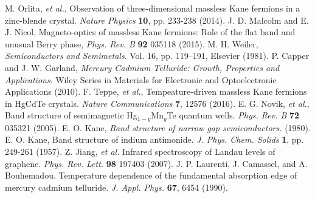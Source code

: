 \documentclass[titlepage,a4paper]{book}
\begin{document}
\begin{thebibliography}{99}
M. Orlita, \textit{et al.}, Observation of three-dimensional massless Kane fermions in a zinc-blende crystal. \textit{Nature Physics} \textbf{10}, pp. 233-238 (2014).
J. D. Malcolm and E. J. Nicol, Magneto-optics of massless Kane fermions: Role of the flat band and unusual Berry phase, \textit{Phys. Rev. B} \textbf{92} 035118 (2015).
M. H. Weiler, \textit{Semiconductors and Semimetals}. Vol. 16, pp. 119–191, Elsevier (1981).
P. Capper and J. W. Garland, \textit{Mercury Cadmium Telluride: Growth, Properties and Applications}. Wiley Series in Materials for Electronic and Optoelectronic Applications (2010).
F. Teppe, \textit{et al.}, Tempeature-driven massless Kane fermions in HgCdTe crystals. \textit{Nature Communications} \textbf{7}, 12576 (2016).
E. G. Novik, \textit{et al.}, Band structure of semimagnetic Hg$_{1-y}$Mn$_y$Te quantum wells. \textit{Phys. Rev. B} \textbf{72} 035321 (2005).
E. O. Kane, \textit{Band structure of narrow gap semiconductors.} (1980).
E. O. Kane, Band structure of indium antimonide. \textit{J. Phys. Chem. Solids} \textbf{1}, pp. 249-261 (1957).
Z. Jiang, \textit{et al.} Infrared spectroscopy of Landau levels of graphene. \textit{Phys. Rev. Lett.} \textbf{98} 197403 (2007).
J. P. Laurenti, J. Camassel, and A. Bouhemadou. Temperature dependence of the fundamental absorption edge of mercury cadmium telluride. \textit{J. Appl. Phys.} \textbf{67}, 6454 (1990).


\end{thebibliography}
\end{document}
